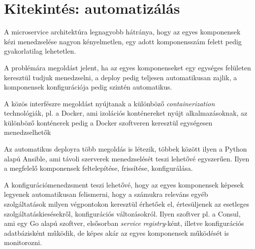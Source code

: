 \section{Kitekintés: automatizálás}

A microservice architektúra legnagyobb hátránya, hogy az egyes komponensek
kézi menedzselése nagyon kényelmetlen, egy adott komponensszám felett
pedig gyakorlatilag lehetetlen.

A problémára megoldást jelent, ha az egyes komponenseket egy egységes
felületen keresztül tudjuk menedzselni, a deploy pedig teljesen automatikusan
zajlik, a komponensek konfigurációja pedig szintén automatikus.

A közös interfészre megoldást nyújtanak a különböző \emph{containerization}
technológiák, pl. a Docker\cite{Docker}, ami izolációs konténereket nyújt alkalmazásoknak,
az különböző konténerek pedig a Docker szoftveren keresztül egységesen
menedzselhetők

Az automatikus deployra több megoldás is létezik, többek között ilyen
a Python alapú Ansible\cite{Ansible}, ami távoli szerverek menedzselését teszi lehetővé
egyszerűen. Ilyen a megfelelő komponensek feltelepítése, frissítése,
konfigurálása.

A konfigurációmenedzsment teszi lehetővé, hogy az egyes komponensek
képesek legyenek automatikusan felismerni, hogy a számukra releváns egyéb
szolgáltatások milyen végpontokon keresztül érhetőek el, értesüljenek
az esetleges szolgáltatáskiesésekről, konfigurációs változásokról.
Ilyen szoftver pl. a Consul\cite{Consul}, ami egy Go alapú szoftver, elsősorban
\emph{service registry}-ként, illetve konfigurációs adatbázisként működik,
de képes akár az egyes komponensek működését is monitorozni.
